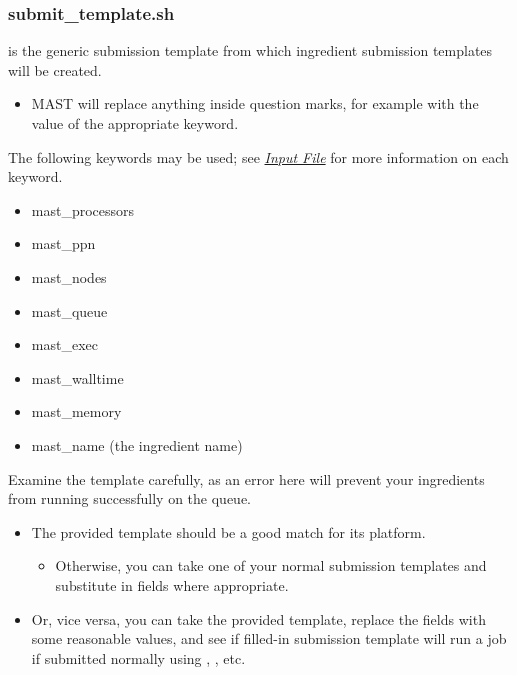 \documentclass[letterpaper,10pt,english]{sphinxmanual}
\begin{document}
\subsubsection{submit\_template.sh}
\label{1_0_installation:submit-template-sh}
 is the generic submission template from which ingredient submission templates will be created.
\begin{itemize}
\item {} 
MAST will replace anything inside question marks, for example  with the value of the appropriate keyword.

\end{itemize}

The following keywords may be used; see {\hyperref[3_0_inputfile::doc]{\emph{Input File}}} for more information on each keyword.
\begin{itemize}
\item {} 
mast\_processors

\item {} 
mast\_ppn

\item {} 
mast\_nodes

\item {} 
mast\_queue

\item {} 
mast\_exec

\item {} 
mast\_walltime

\item {} 
mast\_memory

\item {} 
mast\_name (the ingredient name)

\end{itemize}

Examine the template carefully, as an error here will prevent your ingredients from running successfully on the queue.
\begin{itemize}
\item {} 
The provided template should be a good match for its platform.
\begin{itemize}
\item {} 
Otherwise, you can take one of your normal submission templates and substitute in  fields where appropriate.

\end{itemize}

\item {} 
Or, vice versa, you can take the provided template, replace the  fields with some reasonable values, and see if filled-in submission template will run a job if submitted normally using , , etc.

\end{itemize}
\end{document}
